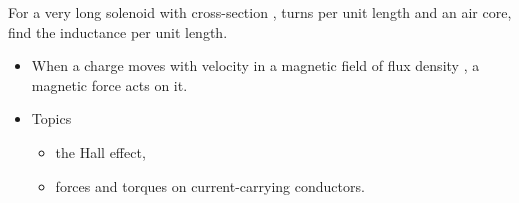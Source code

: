 
\begin{ELexample}{}

For a very long solenoid with cross-section ,  turns per unit length and an air core, find the inductance per unit length.

\begin{ELsolution}


\end{ELsolution}

\end{ELexample}

\ELhold


\begin{ELunit}

\begin{itemize}
\tightlist
\item
  When a charge  moves with velocity  in a magnetic field of flux density , a magnetic force  acts on it.
\end{itemize}


\begin{itemize}
\tightlist
\item
  Topics

  \begin{itemize}
  \tightlist
  \item
    the Hall effect,
  \item
    forces and torques on current-carrying conductors.
  \end{itemize}
\end{itemize}

\end{ELunit}

\ELhold


